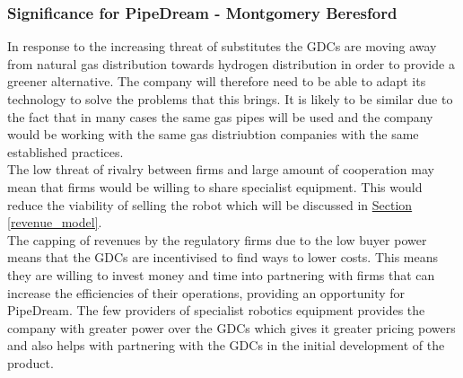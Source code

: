 \documentclass[11pt]{article}		%
\newcommand{\sectref}[1]{\hyperref[#1]{Section \ref*{#1}}}     %
\begin{document}
                
                
            
               \subsubsection[Significance for PipeDream]{Significance for PipeDream - Montgomery Beresford}
                In response to the increasing threat of substitutes the GDCs are moving away from natural gas distribution towards hydrogen distribution in order to provide a greener alternative. The company will therefore need to be able to adapt its technology to solve the problems that this brings. It is likely to be similar due to the fact that in many cases the same gas pipes will be used and the company would be working with the same gas distriubtion companies with the same established practices.
                \\
                The low threat of rivalry between firms and large amount of cooperation may mean that firms would be willing to share specialist equipment. This would  reduce the viability of selling the robot which will be discussed in \sectref{revenue_model}. 
                \\
                The capping of revenues by the regulatory firms due to the low buyer power means that the GDCs are incentivised to find ways to lower costs. This means they are willing to invest money and time into partnering with firms that can increase the efficiencies of their operations, providing an opportunity for PipeDream.
                The few providers of specialist robotics equipment provides the company with greater power over the GDCs which gives it greater pricing powers and also helps with partnering with the GDCs in the initial development of the product.
        
\end{document}
